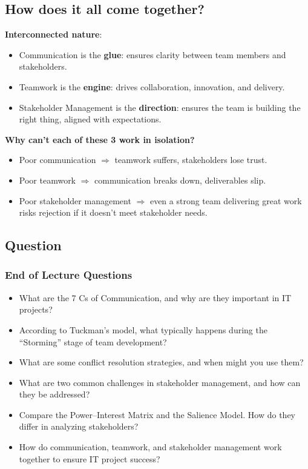 \subsection{How does it all come together?}

\indent 

\noindent\textbf{Interconnected nature}:

\begin{itemize}
    \item Communication is the \textbf{glue}: ensures clarity between team members and stakeholders.
    \item Teamwork is the \textbf{engine}: drives collaboration, innovation, and delivery.
    \item Stakeholder Management is the \textbf{direction}: ensures the team is building the right thing, aligned with expectations.
\end{itemize}

\bigskip

\noindent\textbf{Why can't each of these 3 work in isolation?}

\begin{itemize}
    \item Poor communication $\Longrightarrow$ teamwork suffers, stakeholders lose trust.
    \item Poor teamwork $\Longrightarrow$ communication breaks down, deliverables slip.
    \item Poor stakeholder management $\Longrightarrow$ even a strong team delivering great work risks rejection if it doesn’t meet stakeholder needs.
\end{itemize}

\subsection{Question}

\subsubsection{End of Lecture Questions}

\begin{itemize}
    \item What are the 7 Cs of Communication, and why are they important in IT projects?
    \item According to Tuckman’s model, what typically happens during the “Storming” stage of team development?
    \item What are some conflict resolution strategies, and when might you use them?
    \item What are two common challenges in stakeholder management, and how can they be addressed?
    \item Compare the Power–Interest Matrix and the Salience Model. How do they differ in analyzing stakeholders?
    \item How do communication, teamwork, and stakeholder management work together to ensure IT project success?
\end{itemize}


